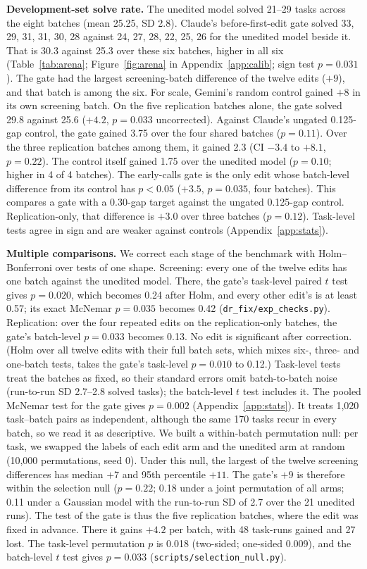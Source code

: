 \textbf{Development-set solve rate.} The unedited model solved 21--29 tasks across the eight batches (mean 25.25, SD 2.8). Claude's before-first-edit gate solved 33, 29, 31, 31, 30, 28 against 24, 27, 28, 22, 25, 26 for the unedited model beside it. That is 30.3 against 25.3 over these six batches, higher in all six (Table~\ref{tab:arena}; Figure~\ref{fig:arena} in Appendix~\ref{app:calib}; sign test $p = 0.031$). The gate had the largest screening-batch difference of the twelve edits ($+9$), and that batch is among the six. For scale, Gemini's random control gained $+8$ in its own screening batch. On the five replication batches alone, the gate solved 29.8 against 25.6 ($+4.2$, $p = 0.033$ uncorrected). Against Claude's ungated 0.125-gap control, the gate gained 3.75 over the four shared batches ($p = 0.11$). Over the three replication batches among them, it gained 2.3 (CI $-3.4$ to $+8.1$, $p = 0.22$). The control itself gained 1.75 over the unedited model ($p = 0.10$; higher in 4 of 4 batches). The early-calls gate is the only edit whose batch-level difference from its control has $p < 0.05$ ($+3.5$, $p = 0.035$, four batches). This compares a gate with a 0.30-gap target against the ungated 0.125-gap control. Replication-only, that difference is $+3.0$ over three batches ($p = 0.12$). Task-level tests agree in sign and are weaker against controls (Appendix~\ref{app:stats}).

\textbf{Multiple comparisons.} We correct each stage of the benchmark with Holm--Bonferroni over tests of one shape. Screening: every one of the twelve edits has one batch against the unedited model. There, the gate's task-level paired $t$ test gives $p = 0.020$, which becomes 0.24 after Holm, and every other edit's is at least 0.57; its exact McNemar $p = 0.035$ becomes 0.42 (\texttt{dr\_fix/exp\_checks.py}). Replication: over the four repeated edits on the replication-only batches, the gate's batch-level $p = 0.033$ becomes 0.13. No edit is significant after correction. (Holm over all twelve edits with their full batch sets, which mixes six-, three- and one-batch tests, takes the gate's task-level $p = 0.010$ to 0.12.) Task-level tests treat the batches as fixed, so their standard errors omit batch-to-batch noise (run-to-run SD 2.7--2.8 solved tasks); the batch-level $t$ test includes it. The pooled McNemar test for the gate gives $p = 0.002$ (Appendix~\ref{app:stats}). It treats 1,020 task--batch pairs as independent, although the same 170 tasks recur in every batch, so we read it as descriptive. We built a within-batch permutation null: per task, we swapped the labels of each edit arm and the unedited arm at random (10,000 permutations, seed 0). Under this null, the largest of the twelve screening differences has median $+7$ and 95th percentile $+11$. The gate's $+9$ is therefore within the selection null ($p = 0.22$; 0.18 under a joint permutation of all arms; 0.11 under a Gaussian model with the run-to-run SD of 2.7 over the 21 unedited runs). The test of the gate is thus the five replication batches, where the edit was fixed in advance. There it gains $+4.2$ per batch, with 48 task-runs gained and 27 lost. The task-level permutation $p$ is 0.018 (two-sided; one-sided 0.009), and the batch-level $t$ test gives $p = 0.033$ (\texttt{scripts/selection\_null.py}).

